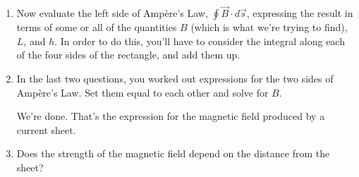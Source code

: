 \documentclass{article}
\begin{document}
\begin{enumerate}
\item
Now evaluate the left side of Amp\`ere's Law, $\oint \vec B\cdot d\vec s$,
expressing the result in terms of some
or all of the quantities $B$ (which is what we're trying
to find), $L$, and $h$. In order to do this, you'll have to consider
the integral along each of the four sides of the rectangle,
and add them up.

\item In the last two questions, you worked out expressions
for the two sides of Amp\`ere's Law. Set them equal to each other
and solve for $B$.

We're done. That's the expression for the magnetic field produced 
by a current sheet.

\item Does the strength of the magnetic field depend on the
distance from the sheet?

\end{enumerate}
\end{document}
